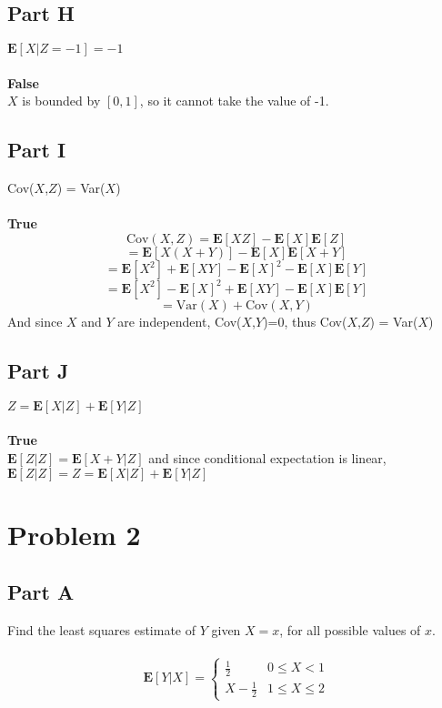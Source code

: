 \documentclass{amsart}
\begin{document}
	\subsection{Part H}
	$\textbf{E}[X|Z=-1]=-1$\\
	\\
	\textbf{False}\\
	$X$ is bounded by $[0,1]$, so it cannot take the value of -1.\\
	\subsection{Part I}
	Cov($X$,$Z$) = Var($X$)\\
	\\
	\textbf{True}\\
	\[
		\text{Cov}(X,Z) = \textbf{E}[XZ] - \textbf{E}[X]\textbf{E}[Z]
	\]
	\[
		= \textbf{E}[X(X+Y)] - \textbf{E}[X]\textbf{E}[X+Y]
	\]
	\[
		= \textbf{E}[X^2] + \textbf{E}[XY] - \textbf{E}[X]^2 - \textbf{E}[X]\textbf{E}[Y]
	\]
	\[
		= \textbf{E}[X^2] - \textbf{E}[X]^2 + \textbf{E}[XY] - \textbf{E}[X]\textbf{E}[Y]
	\]
	\[
		= \text{Var}(X) + \text{Cov}(X,Y)
	\]
	And since $X$ and $Y$ are independent, Cov($X$,$Y$)=0, thus Cov($X$,$Z$) = Var($X$)\\
	\subsection{Part J}
	$Z = \textbf{E}[X|Z] + \textbf{E}[Y|Z]$\\
	\\
	\textbf{True}\\
	$\textbf{E}[Z|Z] = \textbf{E}[X+Y|Z]$ and since conditional expectation is linear, $\textbf{E}[Z|Z] = Z = \textbf{E}[X|Z] + \textbf{E}[Y|Z]$
	\pagebreak
	\section{Problem 2}
	\subsection{Part A}
	Find the least squares estimate of $Y$ given $X=x$, for all possible values of $x$.\\
	\\
	\[
	\mathbf{E}[Y|X] = 
	\begin{cases}
	\frac{1}{2} & 0 \leq X < 1\\
	X-\frac{1}{2} & 1 \leq X \leq 2
	\end{cases}
	\]
	\\
\end{document}
